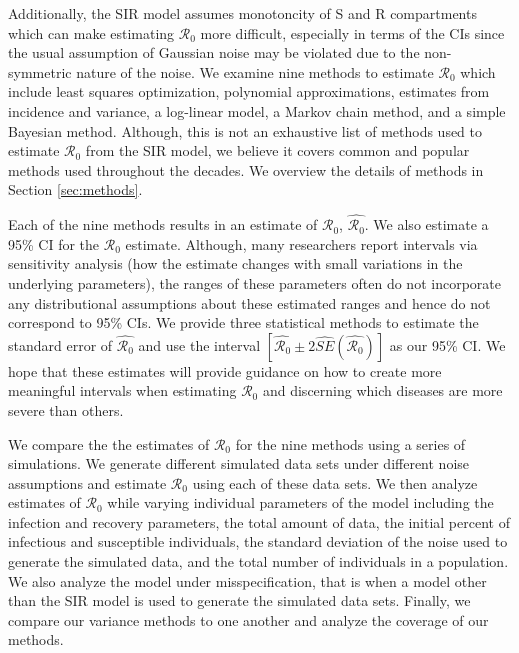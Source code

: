 \documentclass[12pt]{article}
\newcommand{\wxxsir}{nine } %
\newcommand{\rr}{\ensuremath{\mathcal{R}_0}}
\begin{document}
Additionally, the SIR model assumes monotoncity of S and R compartments which can make estimating $\rr$ more difficult, especially in terms of the CIs since the usual assumption of Gaussian noise may be violated due to the non-symmetric nature of the noise.  We examine \wxxsir methods to estimate $\rr$ which include least squares optimization, polynomial approximations, estimates from incidence and variance, a log-linear model, a Markov chain method, and a simple Bayesian method.  Although, this is not an exhaustive list of methods used to estimate $\rr$ from the SIR model, we believe it covers common and popular methods used throughout the decades.  We overview the details of methods in Section \ref{sec:methods}.

Each of the \wxxsir methods results in an estimate of $\rr$, $\hat{\rr}$.  We also estimate a 95\% CI for the  $\rr$ estimate.  Although, many researchers report intervals via sensitivity analysis (how the estimate changes with small variations in the underlying parameters), the ranges of these parameters often do not incorporate any distributional assumptions about these estimated ranges and hence do not correspond to 95\% CIs.  We provide three statistical methods to estimate the standard error of $\hat{\rr}$ and use the interval $\left [\hat{\rr} \pm 2\hat{SE}\left (\hat{\rr} \right ) \right ]$ as our 95\% CI.  We hope that these estimates will provide guidance on how to create more meaningful intervals when estimating $\rr$ and discerning which diseases are more severe than others.

We compare the the estimates of $\rr$ for the \wxxsir methods using a series of simulations.  We generate different simulated data sets under different noise assumptions and estimate $\rr$ using each of these data sets.  We then analyze estimates of $\rr$ while varying individual parameters of the model including the infection and recovery parameters, the total amount of data, the initial percent of infectious and susceptible individuals, the standard deviation of the noise used to generate the simulated data, and the total number of individuals in a population.  We also analyze the model under misspecification, that is when a model other than the SIR model is used to generate the simulated data sets.  Finally, we compare our variance methods to one another and analyze the coverage of our methods.

\end{document}
